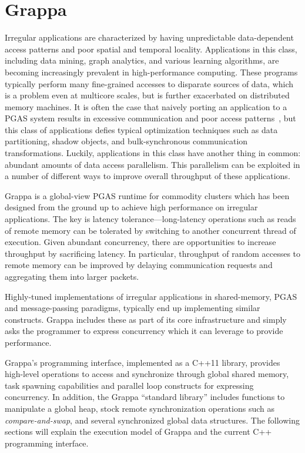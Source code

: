 \section{Grappa}

Irregular applications are characterized by having unpredictable data-dependent access patterns and poor spatial and temporal locality. Applications in this class, including data mining, graph analytics, and various learning algorithms, are becoming increasingly prevalent in high-performance computing. These programs typically perform many fine-grained accesses to disparate sources of data, which is a problem even at multicore scales, but is further exacerbated on distributed memory machines.
It is often the case that naively porting an application to a PGAS system results in excessive communication and poor access patterns~\cite{pgas-analysis}, but this class of applications defies typical optimization techniques such as data partitioning, shadow objects, and bulk-synchronous communication transformations.
Luckily, applications in this class have another thing in common: abundant amounts of data access parallelism. This parallelism can be exploited in a number of different ways to improve overall throughput of these applications.


Grappa is a global-view PGAS runtime for commodity clusters which has been designed from the ground up to achieve high performance on irregular applications. The key is latency tolerance---long-latency operations such as reads of remote memory can be tolerated by switching to another concurrent thread of execution. Given abundant concurrency, there are opportunities to increase throughput by sacrificing latency. In particular, throughput of random accesses to remote memory can be improved by delaying communication requests and aggregating them into larger packets.

Highly-tuned implementations of irregular applications in shared-memory, PGAS and message-passing paradigms, typically end up implementing similar constructs. Grappa includes these as part of its core infrastructure and simply asks the programmer to express concurrency which it can leverage to provide performance.

Grappa's programming interface, implemented as a C++11 library, provides high-level operations to access and synchronize through global shared memory, task spawning capabilities and parallel loop constructs for expressing concurrency. In addition, the Grappa ``standard library'' includes functions to manipulate a global heap, stock remote synchronization operations such as \emph{compare-and-swap}, and several synchronized global data structures. The following sections will explain the execution model of Grappa and the current C++ programming interface.

